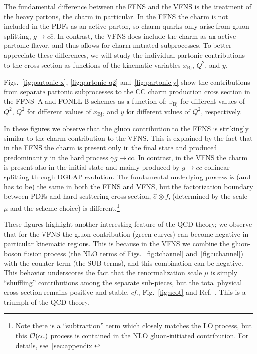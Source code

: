 \documentclass[pdftex,twocolumn,epjc3]{svjour3}          %
\newcommand{\xbj}{\ensuremath{x_{\text{Bj}}}\xspace}
\newcommand{\fonll} {{FONLL-B}\xspace}
\newcommand{\ffns} {{FFNS~A}\xspace}
\begin{document}
%

The fundamental difference between the FFNS and the VFNS is the
treatment of the heavy partons, the charm in particular. In the FFNS
the charm is not included in the PDFs as an active parton, so charm
quarks only arise from gluon splitting, $g\to c \bar{c}$. In contrast,
the VFNS does include the charm as an active partonic flavor, and thus
allows for charm-initiated subprocesses.
%
To better appreciate these differences, we will study the individual
partonic contributions to the cross section as functions of the
kinematic variables \xbj, $Q^2$, and $y$.

Figs.~\ref{fig:partonic-x}, \ref{fig:partonic-q2}
and~\ref{fig:partonic-y} show the contributions from separate partonic
subprocesses to the CC charm production cross section in the \ffns and
\fonll schemes as a function of: \xbj for different values of $Q^2$,
$Q^2$ for different values of \xbj, and $y$ for different values of
$Q^2$, respectively.

%
%
In these figures we observe that the gluon contribution to the FFNS is
strikingly similar to the charm contribution to the VFNS.
%
This is explained by the fact that in the FFNS the charm is present
only in the final state and produced predominantly in the hard process
$\gamma g \to c\bar{c}$. In contrast, in the VFNS the charm is present also
in the initial state and mainly produced by $g\to c\bar{c}$ collinear
splitting through DGLAP evolution.
%
The fundamental underlying process is (and has to be) the same in both
the FFNS and VFNS, but the factorization boundary between PDFs and
hard scattering cross section, $\hat{\sigma}\otimes f$, (determined by
the scale $\mu$ and the scheme choice) is different.\footnote{Note
  there is a ``subtraction'' term which closely matches the LO
  process, but this ${\cal O}(\alpha_s)$ process is contained in the
  NLO gluon-initiated contribution.  For details,
  see~\ref{sec:appendix} }


These figures highlight another interesting feature of the QCD theory;
we observe that for the VFNS the gluon contribution (green curves) can
become negative in particular kinematic regions.
This is because in the VFNS we combine the gluon-boson fusion process
(the NLO terms of Figs.~\ref{fig:tchannel} and~\ref{fig:uchannel})
with the counter-term  (the SUB terms),
and this combination can be negative.
%
This behavior underscores the fact that the renormalization scale $\mu$
is simply ``shuffling'' contributions among the separate sub-pieces,
but the total physical cross section remains positive and stable,
{\it cf.}, Fig.~\ref{fig:acot} and Ref.~\cite{Aivazis:1993pi}.
This is a triumph of the QCD theory. 
\end{document}
